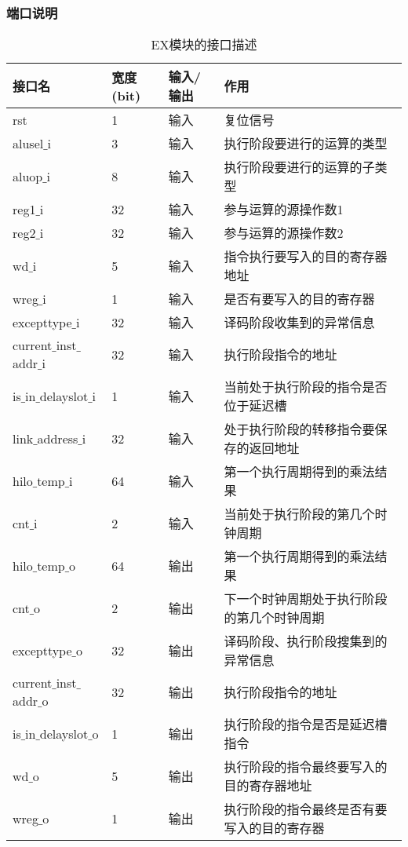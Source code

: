 \subsubsection{端口说明}
\begin{table}[H]
	\centering
	\caption{EX模块的接口描述}
	\begin{tabular}{|l|l|l|l|}
		\hline
		接口名 & 宽度(bit) & 输入/输出 & 作用 \\
		\hline
		rst & 1 & 输入 & 复位信号 \\
		\hline
		alusel$\_$i & 3 & 输入 & 执行阶段要进行的运算的类型 \\
		\hline
		aluop$\_$i & 8 & 输入 & 执行阶段要进行的运算的子类型 \\
		\hline
		reg1$\_$i & 32 & 输入 & 参与运算的源操作数1 \\
		\hline
		reg2$\_$i & 32 & 输入 & 参与运算的源操作数2 \\
		\hline
		wd$\_$i & 5 & 输入 & 指令执行要写入的目的寄存器地址 \\
		\hline
		wreg$\_$i & 1 & 输入 & 是否有要写入的目的寄存器 \\
		\hline
		excepttype$\_$i & 32 & 输入 & 译码阶段收集到的异常信息 \\
		\hline
		current$\_$inst$\_$addr$\_$i & 32 & 输入 & 执行阶段指令的地址 \\
		\hline
		is$\_$in$\_$delayslot$\_$i & 1 & 输入 & 当前处于执行阶段的指令是否位于延迟槽 \\
		\hline
		link$\_$address$\_$i & 32 & 输入 & 处于执行阶段的转移指令要保存的返回地址 \\
		\hline
		hilo$\_$temp$\_$i & 64 & 输入 & 第一个执行周期得到的乘法结果 \\
		\hline
		cnt$\_$i & 2 & 输入 & 当前处于执行阶段的第几个时钟周期 \\
		\hline
		hilo$\_$temp$\_$o & 64 & 输出 & 第一个执行周期得到的乘法结果 \\
		\hline
		cnt$\_$o & 2 & 输出 & 下一个时钟周期处于执行阶段的第几个时钟周期 \\
		\hline
		excepttype$\_$o & 32 & 输出 & 译码阶段、执行阶段搜集到的异常信息 \\
		\hline
		current$\_$inst$\_$addr$\_$o & 32 & 输出 & 执行阶段指令的地址 \\
		\hline
		is$\_$in$\_$delayslot$\_$o & 1 & 输出 & 执行阶段的指令是否是延迟槽指令 \\
		\hline
		wd$\_$o & 5 & 输出 & 执行阶段的指令最终要写入的目的寄存器地址 \\
		\hline
		wreg$\_$o & 1 & 输出 & 执行阶段的指令最终是否有要写入的目的寄存器 \\

\end{tabular}
\end{table}
